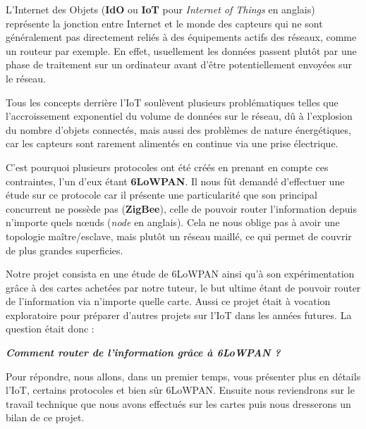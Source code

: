 
L'Internet des Objets (\textbf{IdO} ou \textbf{IoT} pour \textit{Internet of Things} en anglais) représente la jonction entre Internet et le monde des capteurs qui ne sont généralement pas directement reliés à des équipements actifs des réseaux, comme un routeur par exemple. En effet, usuellement les données passent plutôt par une phase de traitement sur un ordinateur avant d'être potentiellement envoyées sur le réseau.

Tous les concepts derrière l'IoT soulèvent plusieurs problématiques telles que l'accroissement exponentiel du volume de données sur le réseau, dû à l'explosion du nombre d'objets connectés, mais aussi des problèmes de nature énergétiques, car les capteurs sont rarement alimentés en continue via une prise électrique.

C'est pourquoi plusieurs protocoles ont été créés en prenant en compte ces contraintes, l'un d'eux étant \textbf{6LoWPAN}. Il nous fût demandé d'effectuer une étude sur ce protocole car il présente une particularité que son principal concurrent ne possède pas (\textbf{ZigBee}), celle de pouvoir router l'information depuis n'importe quels nœuds (\textit{node} en anglais). Cela ne nous oblige pas à avoir une topologie maître/esclave, mais plutôt un réseau maillé, ce qui permet de couvrir de plus grandes superficies.

Notre projet consista en une étude de 6LoWPAN ainsi qu'à son expérimentation grâce à des cartes achetées par notre tuteur, le but ultime étant de pouvoir router de l'information via n'importe quelle carte. Aussi ce projet était à vocation exploratoire pour préparer d'autres projets sur l'IoT dans les années futures. La question était donc :

\begin{center}
\textbf{\textit{Comment router de l'information grâce à 6LoWPAN ?}}
\end{center}

Pour répondre, nous allons, dans un premier temps, vous présenter plus en détails l'IoT, certains protocoles et bien sûr 6LoWPAN. Ensuite nous reviendrons sur le travail technique que nous avons effectués sur les cartes puis nous dresserons un bilan de ce projet.
